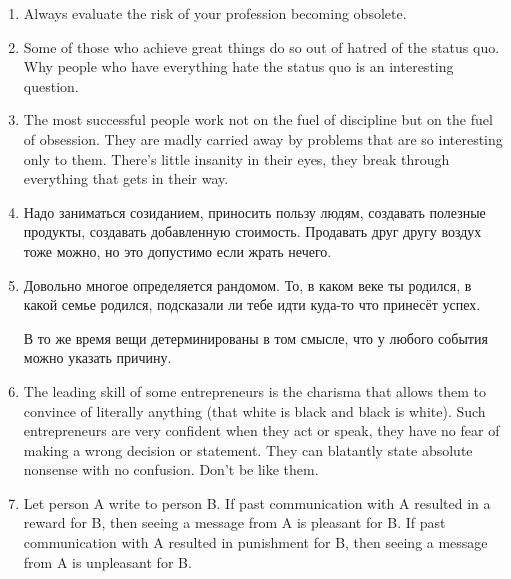 \documentclass[11pt]{article}
\theoremstyle{remark}
\theoremstyle{definition}
\begin{document}
\begin{enumerate}
\item Always evaluate the risk of your profession becoming obsolete.


\item Some of those who achieve great things do so out of hatred of the status quo. Why people who have everything hate the status quo is an interesting question.

\item The most successful people work not on the fuel of discipline but on the fuel of obsession. They are madly carried away by problems that are so interesting only to them. There's little insanity in their eyes, they break through everything that gets in their way. 


\item Надо заниматься созиданием, приносить пользу людям, создавать полезные продукты, создавать добавленную стоимость. Продавать друг другу воздух тоже можно, но это допустимо если жрать нечего.

\item Довольно многое определяется рандомом. То, в каком веке ты родился, в какой семье родился, подсказали ли тебе идти куда-то что принесёт успех.

В то же время вещи детерминированы в том смысле, что у любого события можно указать причину.






\item The leading skill of some entrepreneurs is the charisma that allows them to convince of literally anything (that white is black and black is white). Such entrepreneurs are very confident when they act or speak, they have no fear of making a wrong decision or statement. They can blatantly state absolute nonsense with no confusion. Don't be like them.

\item Let person A write to person B. If past communication with A resulted in a reward for B, then seeing a message from A is pleasant for B. If past communication with A resulted in punishment for B, then seeing a message from A is unpleasant for B.






\end{enumerate}
\end{document}
